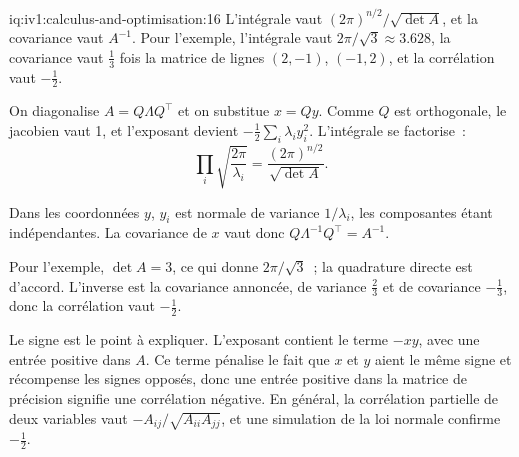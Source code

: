 \begin{solution}{iq:iv1:calculus-and-optimisation:16}
L'intégrale vaut $(2\pi)^{n/2}/\sqrt{\det A}$, et la covariance vaut $A^{-1}$. Pour l'exemple, l'intégrale vaut $2\pi/\sqrt{3} \approx 3.628$, la covariance vaut $\frac13$ fois la matrice de lignes $(2, -1)$, $(-1, 2)$, et la corrélation vaut $-\frac12$.

On diagonalise $A = Q\Lambda Q^\top$ et on substitue $x = Qy$. Comme $Q$ est orthogonale, le jacobien vaut 1, et l'exposant devient $-\frac12\sum_i\lambda_iy_i^2$. L'intégrale se factorise~:
\[
\prod_i\sqrt{\frac{2\pi}{\lambda_i}} = \frac{(2\pi)^{n/2}}{\sqrt{\det A}}.
\]

Dans les coordonnées $y$, $y_i$ est normale de variance $1/\lambda_i$, les composantes étant indépendantes. La covariance de $x$ vaut donc $Q\Lambda^{-1}Q^\top = A^{-1}$.

Pour l'exemple, $\det A = 3$, ce qui donne $2\pi/\sqrt{3}$~; la quadrature directe est d'accord. L'inverse est la covariance annoncée, de variance $\frac23$ et de covariance $-\frac13$, donc la corrélation vaut $-\frac12$.

Le signe est le point à expliquer. L'exposant contient le terme $-xy$, avec une entrée positive dans $A$. Ce terme pénalise le fait que $x$ et $y$ aient le même signe et récompense les signes opposés, donc une entrée positive dans la matrice de précision signifie une corrélation négative. En général, la corrélation partielle de deux variables vaut $-A_{ij}/\sqrt{A_{ii}A_{jj}}$, et une simulation de la loi normale confirme $-\frac12$.



\end{solution}

